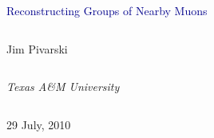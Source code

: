 \documentclass[compress]{beamer}
\begin{document}
\begin{frame}
\vfill
\begin{center}
\textcolor{darkblue}{\Large Reconstructing Groups of Nearby Muons}

\vfill
\begin{columns}
\begin{center}
\large
Jim Pivarski
\end{center}
\end{columns}

\begin{columns}
\begin{center}
\scriptsize
{\it Texas A\&M University}
\end{center}
\end{columns}

\vfill
29 July, 2010

\end{center}
\end{frame}


\small
\end{document}
